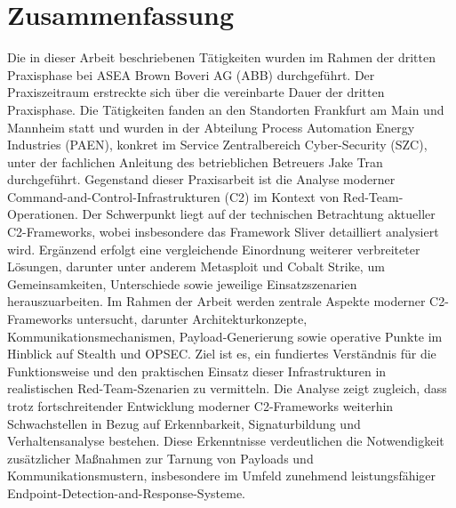\section*{Zusammenfassung}
Die in dieser Arbeit beschriebenen Tätigkeiten wurden im Rahmen der dritten Praxisphase bei ASEA Brown Boveri AG (ABB) durchgeführt. Der Praxiszeitraum erstreckte sich über die vereinbarte Dauer der dritten Praxisphase. Die Tätigkeiten fanden an den Standorten Frankfurt am Main und Mannheim statt und wurden in der Abteilung Process Automation Energy Industries (PAEN), konkret im Service Zentralbereich Cyber-Security (SZC), unter der fachlichen Anleitung des betrieblichen Betreuers Jake Tran durchgeführt.
\newline
\newline
Gegenstand dieser Praxisarbeit ist die Analyse moderner Command-and-Control-Infrastrukturen (C2) im Kontext von Red-Team-Operationen. Der Schwerpunkt liegt auf der technischen Betrachtung aktueller C2-Frameworks, wobei insbesondere das Framework Sliver detailliert analysiert wird. Ergänzend erfolgt eine vergleichende Einordnung weiterer verbreiteter Lösungen, darunter unter anderem Metasploit und Cobalt Strike, um Gemeinsamkeiten, Unterschiede sowie jeweilige Einsatzszenarien herauszuarbeiten.
\newline
\newline
Im Rahmen der Arbeit werden zentrale Aspekte moderner C2-Frameworks untersucht, darunter Architekturkonzepte, Kommunikationsmechanismen, Payload-Generierung sowie operative Punkte im Hinblick auf Stealth und OPSEC. Ziel ist es, ein fundiertes Verständnis für die Funktionsweise und den praktischen Einsatz dieser Infrastrukturen in realistischen Red-Team-Szenarien zu vermitteln.
\newline
\newline
Die Analyse zeigt zugleich, dass trotz fortschreitender Entwicklung moderner C2-Frameworks weiterhin Schwachstellen in Bezug auf Erkennbarkeit, Signaturbildung und Verhaltensanalyse bestehen. Diese Erkenntnisse verdeutlichen die Notwendigkeit zusätzlicher Maßnahmen zur Tarnung von Payloads und Kommunikationsmustern, insbesondere im Umfeld zunehmend leistungsfähiger Endpoint-Detection-and-Response-Systeme.